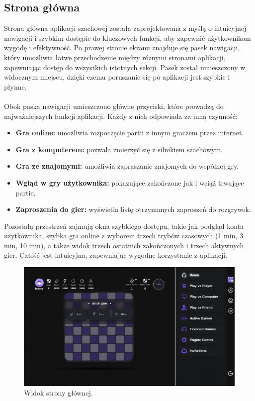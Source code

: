 \documentclass[12pt,a4paper]{article}
\begin{document}
\newpage
\subsection{Strona główna}
Strona główna aplikacji szachowej została zaprojektowana z myślą o intuicyjnej nawigacji i szybkim dostępie do kluczowych funkcji, aby zapewnić użytkownikom wygodę i efektywność. Po prawej stronie ekranu znajduje się pasek nawigacji, który umożliwia łatwe przechodzenie między różnymi stronami aplikacji, zapewniając dostęp do wszystkich istotnych sekcji. Pasek został umieszczony w widocznym miejscu, dzięki czemu poruszanie się po aplikacji jest szybkie i płynne.
\\\\
Obok paska nawigacji umieszczono główne przyciski, które prowadzą do najważniejszych funkcji aplikacji. Każdy z nich odpowiada za inną czynność:
\begin{itemize}
    \item \textbf{Gra online:} umożliwia rozpoczęcie partii z innym graczem przez internet.
    \item \textbf{Gra z komputerem:} pozwala zmierzyć się z silnikiem szachowym.
    \item \textbf{Gra ze znajomymi:} umożliwia zapraszanie znajomych do wspólnej gry.
    \item \textbf{Wgląd w gry użytkownika:} pokazujące zakończone jak i wciąż trwające partie.
    \item \textbf{Zaproszenia do gier:} wyświetla listę otrzymanych zaproszeń do rozgrywek.
\end{itemize}

Pozostałą przestrzeń zajmują okna szybkiego dostępu, takie jak podgląd konta użytkownika, szybka gra online z wyborem trzech trybów czasowych (1 min, 3 min, 10 min), a także widok trzech ostatnich zakończonych i trzech aktywnych gier. Całość jest intuicyjna, zapewniając wygodne korzystanie z aplikacji.

\begin{figure}[h!]
    \centering
    \includegraphics[width=1\textwidth]{zdj/ins_main.png}
    \caption{Widok strony głównej.}
\end{figure}
\end{document}
